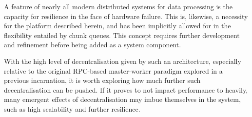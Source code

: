 \documentclass[a4paper,10pt]{article}
\begin{document}
A feature of nearly all modern distributed systems for data processing is the
capacity for resilience in the face of hardware failure.
This is, likewise, a necessity for the platform described herein, and has been
implicitly allowed for in the flexibility entailed by chunk queues.
This concept requires further development and refinement before being added as
a system component.

With the high level of decentralisation given by such an architecture,
especially relative to the original RPC-based master-worker paradigm explored
in a previous incarnation, it is worth exploring how much further such
decentralisation can be pushed.
If it proves to not impact performance to heavily, many emergent effects of
decentralisation may imbue themselves in the system, such as high scalability
and further resilience.

\printbibliography
\end{document}
